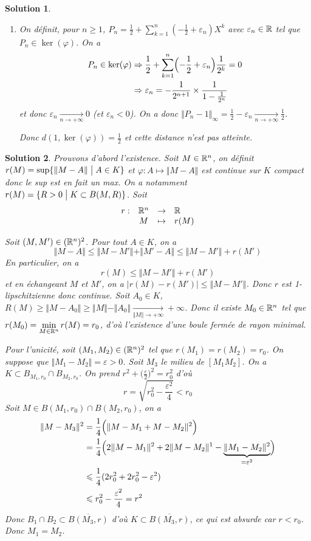 \documentclass[12pt]{article}
\newtheorem{solution}{Solution}[section]
\theoremstyle{remark}
\newcommand{\function}[5]{
	$$
	\begin{array}{rccl}
		#1: & #2 & \to & #3 \\
		& #4 & \mapsto & #5
	\end{array}
	$$
}
\begin{document}
\begin{solution}
\begin{enumerate}
		\item On définit, pour $n\geqslant1$, $P_{n}=\frac{1}{2}+\sum_{k=1}^{n}(-\frac{1}{2}+\varepsilon_{n})X^{k}$ avec $\varepsilon_{n}\in\mathbb{R}$ tel que $P_{n}\in\ker(\varphi)$. On a 
		\begin{align*}
			P_{n}\in\ker(\varphi)
			&\Rightarrow\frac{1}{2}+\sum_{k=1}^{n}\Bigl(-\frac{1}{2}+\varepsilon_{n}\Bigr)\frac{1}{2^{k}}=0\\
			&\Rightarrow\varepsilon_{n}=-\frac{1}{2^{n+1}}\times \frac{1}{1-\frac{1}{2^{n}}}
		\end{align*}
		et donc $\varepsilon_{n}\xrightarrow[n\to+\infty]{}0$ (et $\varepsilon_{n}<0$). On a donc $\Vert P_{n}-1\Vert_{\infty}=\frac{1}{2}-\varepsilon_{n}\xrightarrow[n\to+\infty]{}\frac{1}{2}$.

		Donc $d(1,\ker(\varphi))=\frac{1}{2}$ et cette distance n'est pas atteinte.
	\end{enumerate}
\end{solution}

\begin{solution}
	Prouvons d'abord l'existence. Soit $M\in\mathbb{R}^{n}$, on définit $r(M)=\sup\{\Vert M-A\Vert\bigm| A\in K\}$ et $\varphi\colon A\mapsto\Vert M-A\Vert$ est continue sur $K$ compact donc le sup est en fait un max. On a notamment $r(M)=\{R>0\bigm| K\subset B(M,R)\}$. Soit \function{r}{\R^n}{\R}{M}{r(M)}
	Soit $(M,M')\in(\mathbb{R}^{n})^{2}$. Pour tout $A\in K$, on a 
	$$\Vert M-A\Vert\leqslant\Vert M-M'\Vert+\Vert M'-A\Vert\leqslant\Vert M-M'\Vert +r(M')$$
	En particulier, on a
	$$r(M)\leqslant\Vert M-M'\Vert+r(M')$$
	et en échangeant $M$ et $M'$, on a $\vert r(M)-r(M')\vert\leqslant\Vert M-M'\Vert$. Donc $r$ est 1-lipschitzienne donc continue. Soit $A_{0}\in K$, $R(M)\geqslant\Vert M-A_{0}\Vert\geqslant\Vert M\Vert-\Vert A_{0}\Vert\xrightarrow[\Vert M\Vert\to+\infty]{}+\infty$. Donc il existe $M_{0}\in\mathbb{R}^{n}$ tel que $r(M_{0})=\min\limits_{M\in\mathbb{R}^{n}}r(M)=r_{0}$, d'où l'existence d'une boule fermée de rayon minimal.

	Pour l'unicité, soit $(M_{1},M_{2})\in(\mathbb{R}^{n})^{2}$ tel que $r(M_{1})=r(M_{2})=r_{0}$. On suppose que $\Vert M_{1}-M_{2}\Vert=\varepsilon>0$. Soit $M_{3}$ le milieu de $[M_{1}M_{2}]$. On a $K\subset B_{M_{1},r_{0}}\cap B_{M_{2},r_{0}}$. On prend $r^{2}+\bigl(\frac{\varepsilon}{2}\bigr)^{2}=r_{0}^{2}$ d'où 
	$$r=\sqrt{r_{0}^{2}-\frac{\varepsilon^{2}}{4}}<r_{0}$$
	Soit $M\in B(M_{1},r_{0})\cap B(M_{2},r_{0})$, on a 
	\begin{align*}
		\Vert M-M_{3}\Vert^{2}
		&=\frac{1}{4}\Bigl(\Vert M-M_{1}+M-M_{2}\Vert^{2}\Bigr)\\
		&=\frac{1}{4}\Bigl(2\Vert M-M_{1}\Vert^{2}+2\Vert M-M_{2}\Vert^{1}-\underbrace{\Vert M_{1}-M_{2}\Vert^{2}}_{=\varepsilon^{2}}\Bigr)\\
		&\leqslant\frac{1}{4}(2r_{0}^{2}+2r_{0}^{2}-\varepsilon^{2})\\
		&\leqslant r_{0}^{2}-\frac{\varepsilon^{2}}{4}=r^{2}
	\end{align*}
	Donc $B_{1}\cap B_{2}\subset\overline{B(M_{3},r)}$ d'où $K\subset\overline{B(M_{3},r)}$, ce qui est absurde car $r<r_{0}$. Donc $M_{1}=M_{2}$.
\end{solution}
\end{document}
